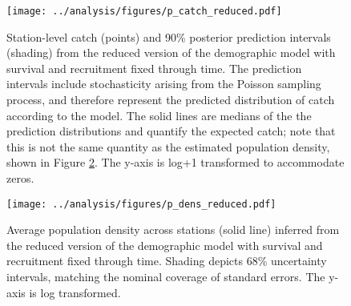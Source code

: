 \documentclass[11pt]{article}
\begin{document}
\begin{figure}
\centering
\texttt{[image: ../analysis/figures/p\_catch\_reduced.pdf]}
\caption{\label{fig:p_catch_reduced}
Station-level catch (points) and 90\% posterior prediction intervals (shading) 
from the reduced version of the demographic model 
with survival and recruitment fixed through time.
The prediction intervals include stochasticity arising from the Poisson sampling process,
and therefore represent the predicted distribution of catch according to the model. 
The solid lines are medians of the the prediction distributions and quantify the expected
catch; note that this is not the same quantity as the estimated population density, 
shown in Figure \ref{fig:p_dens_reduced}.
The y-axis is log+1 transformed to accommodate zeros.
}
\end{figure}
\clearpage

\clearpage
\begin{figure}
\centering
\texttt{[image: ../analysis/figures/p\_dens\_reduced.pdf]}
\caption{\label{fig:p_dens_reduced}
Average population density across stations (solid line)
inferred from the reduced version of the demographic model 
with survival and recruitment fixed through time.
Shading depicts 68\% uncertainty intervals, 
matching the nominal coverage of standard errors.
The y-axis is log transformed.
}
\end{figure}
\clearpage
\end{document}
